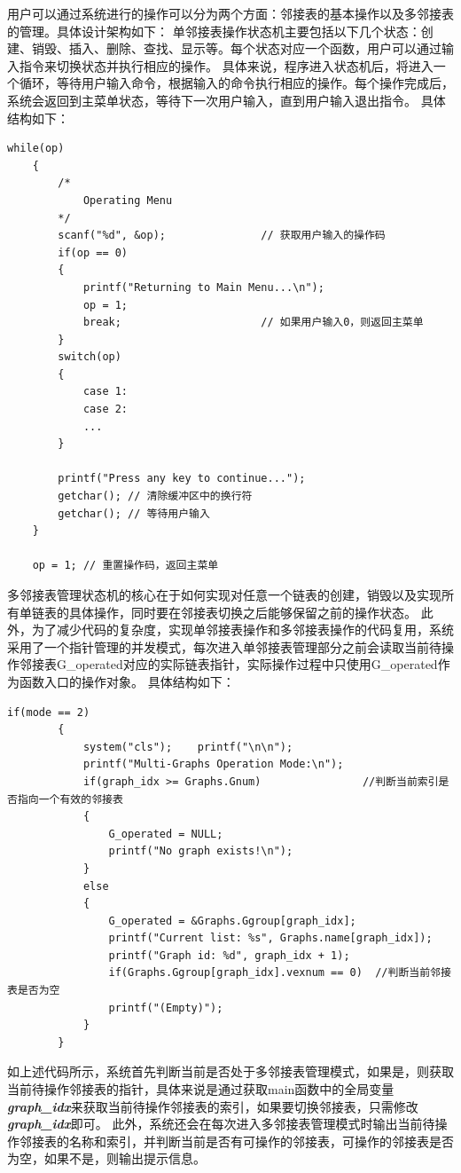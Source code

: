 \documentclass[supercite]{Experimental_Report}
\theoremstyle{definition}
\begin{document}
	用户可以通过系统进行的操作可以分为两个方面：邻接表的基本操作以及多邻接表的管理。具体设计架构如下：
	单邻接表操作状态机主要包括以下几个状态：创建、销毁、插入、删除、查找、显示等。每个状态对应一个函数，用户可以通过输入指令来切换状态并执行相应的操作。
	具体来说，程序进入状态机后，将进入一个循环，等待用户输入命令，根据输入的命令执行相应的操作。每个操作完成后，系统会返回到主菜单状态，等待下一次用户输入，直到用户输入退出指令。
	具体结构如下：
	\begin{lstlisting}[caption={单邻接表操作状态机}, label=lst:state_machine]
	while(op)
	{
		/*
			Operating Menu
		*/
		scanf("%d", &op);				// 获取用户输入的操作码
		if(op == 0)		
		{
			printf("Returning to Main Menu...\n");
			op = 1;
			break;					    // 如果用户输入0，则返回主菜单
		}
		switch(op)
		{
			case 1:
			case 2:
			...
		}

		printf("Press any key to continue...");
		getchar(); // 清除缓冲区中的换行符
		getchar(); // 等待用户输入
	}

	op = 1; // 重置操作码，返回主菜单
	\end{lstlisting}

	多邻接表管理状态机的核心在于如何实现对任意一个链表的创建，销毁以及实现所有单链表的具体操作，同时要在邻接表切换之后能够保留之前的操作状态。
	此外，为了减少代码的复杂度，实现单邻接表操作和多邻接表操作的代码复用，系统采用了一个指针管理的并发模式，每次进入单邻接表管理部分之前会读取当前待操作邻接表G\_operated对应的实际链表指针，实际操作过程中只使用G\_operated作为函数入口的操作对象。
	具体结构如下：
	\begin{lstlisting}[caption={多邻接表管理状态机}, label=lst:multi_state_machine]
	 if(mode == 2)
		{
			system("cls");    printf("\n\n");
			printf("Multi-Graphs Operation Mode:\n");
			if(graph_idx >= Graphs.Gnum)				//判断当前索引是否指向一个有效的邻接表
			{
				G_operated = NULL;
				printf("No graph exists!\n");
			}
			else
			{
				G_operated = &Graphs.Ggroup[graph_idx];
				printf("Current list: %s", Graphs.name[graph_idx]);
				printf("Graph id: %d", graph_idx + 1);
				if(Graphs.Ggroup[graph_idx].vexnum == 0)  //判断当前邻接表是否为空
				printf("(Empty)");
			}
		} 
	\end{lstlisting}
	如上述代码所示，系统首先判断当前是否处于多邻接表管理模式，如果是，则获取当前待操作邻接表的指针，具体来说是通过获取main函数中的全局变量\textit{\textbf{graph\_idx}}来获取当前待操作邻接表的索引，如果要切换邻接表，只需修改\textit{\textbf{graph\_idx}}即可。
	此外，系统还会在每次进入多邻接表管理模式时输出当前待操作邻接表的名称和索引，并判断当前是否有可操作的邻接表，可操作的邻接表是否为空，如果不是，则输出提示信息。
\end{document}
